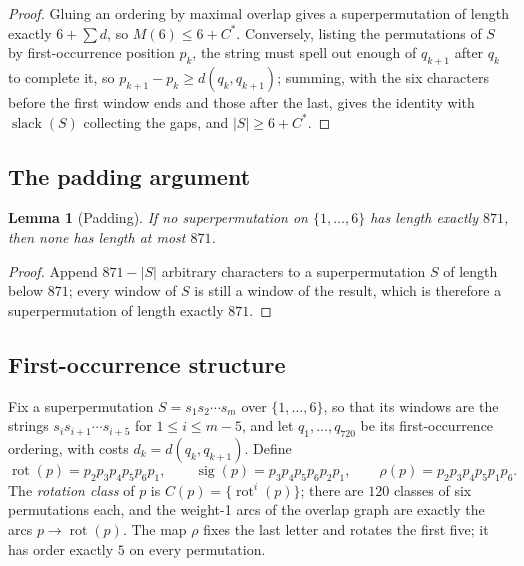 \documentclass[10pt]{article}
\newtheorem{lemma}[theorem]{Lemma}
\theoremstyle{remark}
\theoremstyle{plain}
\newcommand{\rot}{\operatorname{rot}}
\newcommand{\sig}{\operatorname{sig}}
\newcommand{\slack}{\operatorname{slack}}
\begin{document}
\begin{proof}
Gluing an ordering by maximal overlap gives a superpermutation of
length exactly $6+\sum d$, so $M(6)\le 6+C^{*}$.  Conversely, listing
the permutations of $S$ by first-occurrence position $p_k$, the string
must spell out enough of $q_{k+1}$ after $q_k$ to complete it, so
$p_{k+1}-p_k\ge d(q_k,q_{k+1})$; summing, with the six characters
before the first window ends and those after the last, gives the
identity with $\slack(S)$ collecting the gaps, and $|S|\ge 6+C^{*}$.
\end{proof}

\subsection{The padding argument}

\begin{lemma}[Padding]\label{lem:padding}
If no superpermutation on $\{1,\dots,6\}$ has length exactly $871$,
then none has length at most $871$.
\end{lemma}

\begin{proof}
Append $871-|S|$ arbitrary characters to a superpermutation $S$ of
length below $871$; every window of $S$ is still a window of the
result, which is therefore a superpermutation of length exactly $871$.
\end{proof}

\subsection{First-occurrence structure}

Fix a superpermutation $S=s_1s_2\cdots s_m$ over $\{1,\dots,6\}$, so
that its windows are the strings $s_i s_{i+1}\cdots s_{i+5}$ for
$1\le i\le m-5$, and let $q_1,\dots,q_{720}$ be its first-occurrence
ordering, with costs $d_k=d(q_k,q_{k+1})$.  Define
\[
\rot(p)=p_2p_3p_4p_5p_6p_1,\qquad
\sig(p)=p_3p_4p_5p_6p_2p_1,\qquad
\rho(p)=p_2p_3p_4p_5p_1p_6 .
\]
The \emph{rotation class} of $p$ is $C(p)=\{\rot^i(p)\}$; there are
$120$ classes of six permutations each, and the weight-1 arcs of the
overlap graph are exactly the arcs $p\to\rot(p)$.  The map $\rho$ fixes
the last letter and rotates the first five; it has order exactly $5$ on
every permutation.
\end{document}
